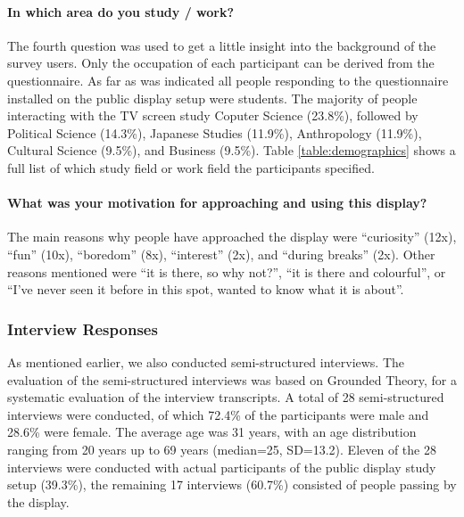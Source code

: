 	\paragraph{In which area do you study / work?}
	The fourth question was used to get a little insight into the background of the survey users. Only the occupation of each participant can be derived from the questionnaire. As far as was indicated all people responding to the questionnaire installed on the public display setup were students. The majority of people interacting with the TV screen study Coputer Science (23.8\%), followed by Political Science (14.3\%), Japanese Studies (11.9\%), Anthropology (11.9\%), Cultural Science (9.5\%), and Business (9.5\%). Table \ref{table:demographics} shows a full list of which study field or work field the participants specified.

	\paragraph{What was your motivation for approaching and using this display?}
	The main reasons why people have approached the display were ``curiosity'' (12x), ``fun'' (10x), ``boredom'' (8x), ``interest'' (2x), and ``during breaks'' (2x). Other reasons mentioned were ``it is there, so why not?'', ``it is there and colourful'', or ``I've never seen it before in this spot, wanted to know what it is about''.





	\subsubsection{Interview Responses}

	As mentioned earlier, we also conducted semi-structured interviews. The evaluation of the semi-structured interviews was based on Grounded Theory, for a systematic evaluation of the interview transcripts. A total of 28 semi-structured interviews were conducted, of which 72.4\% of the participants were male and 28.6\% were female. The average age was 31 years, with an age distribution ranging from 20 years up to 69 years (median=25, SD=13.2). Eleven of the 28 interviews were conducted with actual participants of the public display study setup (39.3\%), the remaining 17 interviews (60.7\%) consisted of people passing by the display. 

